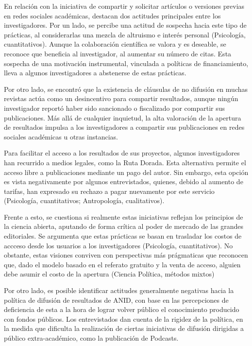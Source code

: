 \documentclass[
  letterpaper,
  DIV=11,
  numbers=noendperiod]{scrreprt}
\begin{document}
En relación con la iniciativa de compartir y solicitar artículos o
versiones previas en redes sociales académicas, destacan dos actitudes
principales entre los investigadores. Por un lado, se percibe una
actitud de sospecha hacia este tipo de prácticas, al considerarlas una
mezcla de altruismo e interés personal (Psicología, cuantitativos).
Aunque la colaboración científica se valora y es deseable, se reconoce
que beneficia al investigador, al aumentar su número de citas. Esta
sospecha de una motivación instrumental, vinculada a políticas de
financiamiento, lleva a algunos investigadores a abstenerse de estas
prácticas.

Por otro lado, se encontró que la existencia de cláusulas de no difusión
en muchas revistas actúa como un desincentivo para compartir resultados,
aunque ningún investigador reportó haber sido sancionado o fiscalizado
por compartir sus publicaciones. Más allá de cualquier inquietud, la
alta valoración de la apertura de resultados impulsa a los
investigadores a compartir sus publicaciones en redes sociales
académicas u otras instancias.

Para facilitar el acceso a los resultados de sus proyectos, algunos
investigadores han recurrido a medios legales, como la Ruta Dorada. Esta
alternativa permite el acceso libre a publicaciones mediante un pago del
autor. Sin embargo, esta opción es vista negativamente por algunos
entrevistados, quienes, debido al aumento de tarifas, han expresado su
rechazo a pagar nuevamente por este servicio (Psicología, cuantitativos;
Antropología, cualitativos).

Frente a esto, se cuestiona si realmente estas iniciativas reflejan los
principios de la ciencia abierta, aputando de forma crítica al poder de
mercado de las grandes editoriales. Se argumenta que estas prácticas se
basan en trasladar los costos de accceso desde los usuarios a los
investigadores (Psicología, cuantitativos). No obstante, estas visiones
conviven con perspectivas más prágmaticas que reconocen que, dado el
modelo basado en el referato gratuito y la venta de acceso, alguien debe
asumir el costo de la apertura (Ciencia Política, métodos mixtos)

Por otro lado, es posible identificar actitudes generalmente negativas
hacia la política de difusión de resultados de ANID, con base en las
percepciones de deficiencia de esta a la hora de lograr volver público
el conocimiento producido con fondos públicos. Los entrevistados dan
cuenta de la rigidez de la política, en la medida que dificulta la
realización de ciertas iniciativas de difusión dirigidas a público
extra-académico, como la publicación de Podcasts.
\end{document}
